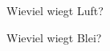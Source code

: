 \documentclass[12pt,ngerman]{exam}
\begin{document}
\begin{questions}
\question[5]
Wieviel wiegt Luft?

\question[5]
Wieviel wiegt Blei?

\end{questions}
\end{document}
